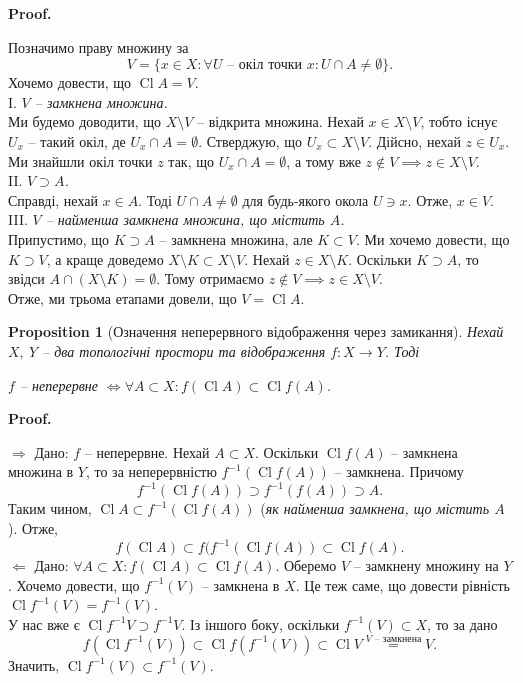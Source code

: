 \documentclass[a4paper, 10pt]{article}
\makeatletter
\def\rightproof{$\boxed{\Rightarrow}$ }
\def\leftproof{$\boxed{\Leftarrow}$ }
\theoremstyle{theoremdd}
\newtheorem{proposition}[theorem]{Proposition}
\DeclareMathOperator{\Cl}{Cl}
\renewenvironment{proof}[1][Proof.\\]{\par
\pushQED{\hfill \qed}%
\normalfont \topsep6\p@\@plus6\p@\relax
\trivlist
\item\relax
{\bfseries
#1\@addpunct{.}}\hspace\labelsep\ignorespaces
}{%
\popQED\endtrivlist\@endpefalse
}
\makeatother
\begin{document}
\begin{proof}
Позначимо праву множину за \[
V = \{x \in X: \forall U \text{ -- окіл точки $x$}: U \cap A \neq \emptyset\}.
\]
Хочемо довести, що $\Cl A = V$.
\bigskip \\
I. \textit{$V$ -- замкнена множина.}\\
Ми будемо доводити, що $X \setminus V$ -- відкрита множина. Нехай $x \in X \setminus V$, тобто існує $U_x$ -- такий окіл, де $U_x \cap A = \emptyset$. Стверджую, що $U_x \subset X \setminus V$. Дійсно, нехай $z \in U_x$. Ми знайшли окіл точки $z$ так, що $U_x \cap A = \emptyset$, а тому вже $z \notin V \implies z \in X \setminus V$.
\bigskip \\
II. \textit{$V \supset A$.}\\
Справді, нехай $x \in A$. Тоді $U \cap A \neq \emptyset$ для будь-якого окола $U \ni x$. Отже, $x \in V$.
\bigskip \\
III. \textit{$V$ -- найменша замкнена множина, що містить $A$.}\\
Припустимо, що $K \supset A$ -- замкнена множина, але $K \subset V$. Ми хочемо довести, що $K \supset V$, а краще доведемо $X \setminus K \subset X \setminus V$. Нехай $z \in X \setminus K$. Оскільки $K \supset A$, то звідси $A \cap (X \setminus K) = \emptyset$. Тому отримаємо $z \notin V \implies z \in X \setminus V$.\\
Отже, ми трьома етапами довели, що $V = \Cl A$.
\end{proof}

\begin{proposition}[Означення неперервного відображення через замикання]
Нехай $X,\ Y$ -- два топологічні простори та відображення $f \colon X \to Y$. Тоді
\begin{center}
$f$ -- неперервне $\iff \forall A \subset X: f(\Cl A) \subset \Cl f(A)$.
\end{center}
\end{proposition}

\begin{proof}
\rightproof Дано: $f$ -- неперервне. Нехай $A \subset X$. Оскільки $\Cl f(A)$ -- замкнена множина в $Y$, то за неперервністю $f^{-1} (\Cl f(A))$ -- замкнена. Причому 
\[
f^{-1}(\Cl f(A)) \supset f^{-1} (f(A)) \supset A.
\]
Таким чином, $\Cl A \subset f^{-1} (\Cl f(A))$ (\textit{як найменша замкнена, що містить $A$}). Отже,
 \[
f(\Cl A) \subset f(f^{-1}(\Cl f(A)) \subset \Cl f(A).
\]
\leftproof Дано: $\forall A \subset X: f(\Cl A) \subset \Cl f(A)$. Оберемо $V$ -- замкнену множину на $Y$. Хочемо довести, що $f^{-1}(V)$ -- замкнена в $X$. Це теж саме, що довести рівність $\Cl f^{-1}(V) = f^{-1}(V)$.\\
У нас вже є $\Cl f^{-1} V \supset f^{-1} V$. Із іншого боку, оскільки $f^{-1}(V) \subset X$, то за дано \[
f(\Cl f^{-1}(V)) \subset \Cl f(f^{-1}(V)) \subset \Cl V \overset{\text{$V$ -- замкнена}}{=} V.
\]
Значить, $\Cl f^{-1}(V) \subset f^{-1}(V)$.
\end{proof}
\end{document}
